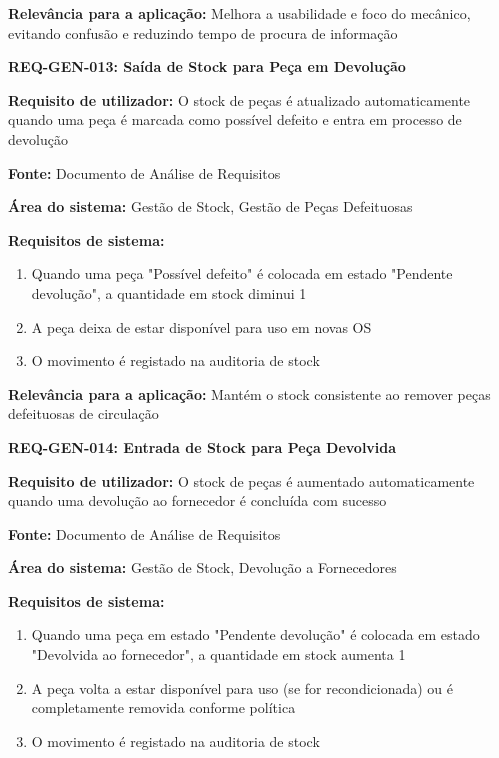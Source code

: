 \documentclass[11pt,a4paper]{article}
\newcommand{\reqheader}[1]{{\noindent\large\bfseries\color{sectionblue}#1}\par\vspace{0.3cm}}
\newcommand{\reqfield}[2]{{\noindent\textbf{#1:} #2}\par\vspace{0.2cm}}
\begin{document}
\reqfield{Relevância para a aplicação}{Melhora a usabilidade e foco do mecânico, evitando confusão e reduzindo tempo de procura de informação}

\vspace{0.8cm}

\reqheader{REQ-GEN-013: Saída de Stock para Peça em Devolução}

\reqfield{Requisito de utilizador}{O stock de peças é atualizado automaticamente quando uma peça é marcada como possível defeito e entra em processo de devolução}

\reqfield{Fonte}{Documento de Análise de Requisitos}

\reqfield{Área do sistema}{Gestão de Stock, Gestão de Peças Defeituosas}

\reqfield{Requisitos de sistema}{
	\begin{enumerate}
		\item Quando uma peça "Possível defeito" é colocada em estado "Pendente devolução", a quantidade em stock diminui 1
		\item A peça deixa de estar disponível para uso em novas OS
		\item O movimento é registado na auditoria de stock
	\end{enumerate}
}

\reqfield{Relevância para a aplicação}{Mantém o stock consistente ao remover peças defeituosas de circulação}

\vspace{0.8cm}

\reqheader{REQ-GEN-014: Entrada de Stock para Peça Devolvida}

\reqfield{Requisito de utilizador}{O stock de peças é aumentado automaticamente quando uma devolução ao fornecedor é concluída com sucesso}

\reqfield{Fonte}{Documento de Análise de Requisitos}

\reqfield{Área do sistema}{Gestão de Stock, Devolução a Fornecedores}

\reqfield{Requisitos de sistema}{
	\begin{enumerate}
		\item Quando uma peça em estado "Pendente devolução" é colocada em estado "Devolvida ao fornecedor", a quantidade em stock aumenta 1
		\item A peça volta a estar disponível para uso (se for recondicionada) ou é completamente removida conforme política
		\item O movimento é registado na auditoria de stock
	\end{enumerate}
}
\end{document}
